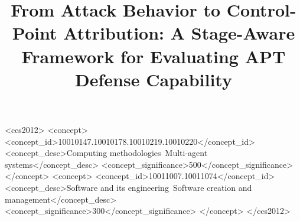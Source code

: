 \documentclass[sigconf, anonymous, review]{acmart}
\begin{document}
\title[Stage-Aware APT Defense Evaluation]
{From Attack Behavior to Control-Point Attribution:
A Stage-Aware Framework for Evaluating APT Defense Capability}





\renewcommand{\shortauthors}{Cai et al.}




\begin{CCSXML}
<ccs2012>
   <concept>
       <concept_id>10010147.10010178.10010219.10010220</concept_id>
       <concept_desc>Computing methodologies~Multi-agent systems</concept_desc>
       <concept_significance>500</concept_significance>
       </concept>
   <concept>
       <concept_id>10011007.10011074</concept_id>
       <concept_desc>Software and its engineering~Software creation and management</concept_desc>
       <concept_significance>300</concept_significance>
       </concept>
 </ccs2012>
\end{CCSXML}




\end{document}

